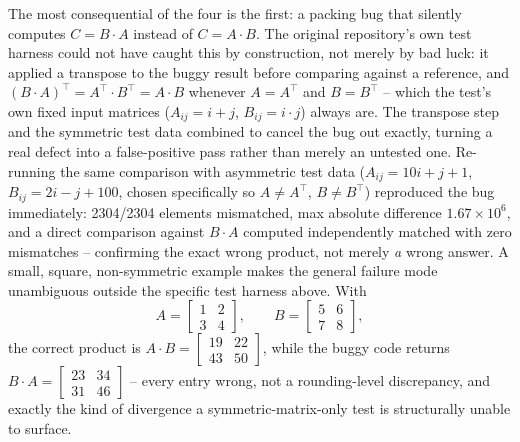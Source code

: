 \documentclass[acmsmall]{acmart}
\begin{document}
The most consequential of the four is the first: a packing bug that
silently computes $C=B{\cdot}A$ instead of $C=A{\cdot}B$. The original
repository's own test harness could not have caught this by construction,
not merely by bad luck: it applied a transpose to the buggy result before
comparing against a reference, and $(B{\cdot}A)^{\!\top}=A^{\!\top}{\cdot}B^{\!\top}=A{\cdot}B$
whenever $A=A^{\!\top}$ and $B=B^{\!\top}$ -- which the test's own fixed
input matrices ($A_{ij}=i+j$, $B_{ij}=i{\cdot}j$) always are. The
transpose step and the symmetric test data combined to cancel the bug
out exactly, turning a real defect into a false-positive pass rather
than merely an untested one. Re-running the same comparison with
asymmetric test data ($A_{ij}=10i+j+1$, $B_{ij}=2i-j+100$, chosen
specifically so $A\ne A^{\!\top}$, $B\ne B^{\!\top}$) reproduced the bug
immediately: 2304/2304 elements mismatched, max absolute difference
$1.67\times10^6$, and a direct comparison against $B{\cdot}A$ computed
independently matched with zero mismatches -- confirming the exact
wrong product, not merely \emph{a} wrong answer.
A small, square, non-symmetric example makes the general failure mode
unambiguous outside the specific test harness above. With
\[
A=\begin{bmatrix}1&2\\3&4\end{bmatrix}, \qquad
B=\begin{bmatrix}5&6\\7&8\end{bmatrix},
\]
the correct product is $A{\cdot}B=\begin{bmatrix}19&22\\43&50\end{bmatrix}$,
while the buggy code returns $B{\cdot}A=\begin{bmatrix}23&34\\31&46\end{bmatrix}$
-- every entry wrong, not a rounding-level discrepancy, and exactly the
kind of divergence a symmetric-matrix-only test is structurally unable
to surface.
\end{document}
